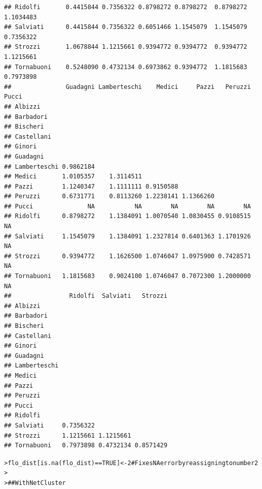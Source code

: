 \documentclass[12pt]{article}\usepackage[]{graphicx}\usepackage[]{color}
\makeatletter
\newcommand{\hlnum}[1]{\textcolor[rgb]{0.82,0.78,0.62}{#1}}%
\newcommand{\hlcom}[1]{\textcolor[rgb]{0.404,0.408,0.42}{#1}}%
\newcommand{\hlopt}[1]{\textcolor[rgb]{0.882,0.878,0.898}{#1}}%
\newcommand{\hlstd}[1]{\textcolor[rgb]{0.882,0.878,0.898}{#1}}%
\newcommand{\hlkwb}[1]{\textcolor[rgb]{0.902,0.675,0.196}{#1}}%
\newcommand{\hlkwd}[1]{\textcolor[rgb]{0.733,0.388,0.812}{#1}}%
\newenvironment{kframe}{%
 \def\at@end@of@kframe{}%
 \ifinner\ifhmode%
  \def\at@end@of@kframe{\end{minipage}}%
  \begin{minipage}{\columnwidth}%
 \fi\fi%
 \def\FrameCommand##1{\hskip\@totalleftmargin \hskip-\fboxsep
 \colorbox{shadecolor}{##1}\hskip-\fboxsep
     \hskip-\linewidth \hskip-\@totalleftmargin \hskip\columnwidth}%
 \MakeFramed {\advance\hsize-\width
   \@totalleftmargin\z@ \linewidth\hsize
   \@setminipage}}%
 {\par\unskip\endMakeFramed%
 \at@end@of@kframe}
\newenvironment{knitrout}{}{} %
\makeatother
\begin{document}
\begin{flushleft}
\begin{center}
\begin{knitrout}
\begin{kframe}
\begin{verbatim}
## Ridolfi       0.4415844 0.7356322 0.8798272 0.8798272  0.8798272 1.1034483
## Salviati      0.4415844 0.7356322 0.6051466 1.1545079  1.1545079 0.7356322
## Strozzi       1.0678844 1.1215661 0.9394772 0.9394772  0.9394772 1.1215661
## Tornabuoni    0.5248090 0.4732134 0.6973862 0.9394772  1.1815683 0.7973898
##               Guadagni Lamberteschi    Medici     Pazzi   Peruzzi     Pucci
## Albizzi                                                                    
## Barbadori                                                                  
## Bischeri                                                                   
## Castellani                                                                 
## Ginori                                                                     
## Guadagni                                                                   
## Lamberteschi 0.9862184                                                     
## Medici       1.0105357    1.3114511                                        
## Pazzi        1.1240347    1.1111111 0.9150588                              
## Peruzzi      0.6731771    0.8113260 1.2238141 1.1366260                    
## Pucci               NA           NA        NA        NA        NA          
## Ridolfi      0.8798272    1.1384091 1.0070540 1.0830455 0.9108515        NA
## Salviati     1.1545079    1.1384091 1.2327814 0.6401363 1.1701926        NA
## Strozzi      0.9394772    1.1626500 1.0746047 1.0975900 0.7428571        NA
## Tornabuoni   1.1815683    0.9024100 1.0746047 0.7072300 1.2000000        NA
##                Ridolfi  Salviati   Strozzi
## Albizzi                                   
## Barbadori                                 
## Bischeri                                  
## Castellani                                
## Ginori                                    
## Guadagni                                  
## Lamberteschi                              
## Medici                                    
## Pazzi                                     
## Peruzzi                                   
## Pucci                                     
## Ridolfi                                   
## Salviati     0.7356322                    
## Strozzi      1.1215661 1.1215661          
## Tornabuoni   0.7973898 0.4732134 0.8571429
\end{verbatim}
\begin{alltt}
\hlstd{> }\hlstd{flo_dist[}\hlkwd{is.na}\hlstd{(flo_dist)}\hlopt{==}\hlnum{TRUE}\hlstd{]}\hlkwb{<-}\hlnum{2} \hlcom{# Fixes NA error by reassigning to number 2}
\hlstd{> }
\hlstd{> }\hlcom{## With NetCluster}

\end{alltt}
\end{kframe}
\end{knitrout}
\end{center}
\end{flushleft}
\end{document}
